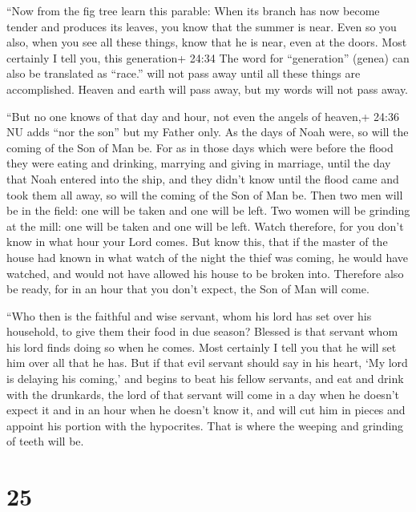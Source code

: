  ``Now from the fig tree learn this parable: When its
branch has now become tender and produces its leaves, you know that the
summer is near.  Even so you also, when you see all these
things, know that he is near, even at the doors.  Most
certainly I tell you, this generation+ 24:34 The word for ``generation''
(genea) can also be translated as ``race.'' will not pass away until all
these things are accomplished.  Heaven and earth will pass
away, but my words will not pass away.

 ``But no one knows of that day and hour, not even the
angels of heaven,+ 24:36 NU adds ``nor the son'' but my Father only.
 As the days of Noah were, so will the coming of the Son of
Man be.  For as in those days which were before the flood
they were eating and drinking, marrying and giving in marriage, until
the day that Noah entered into the ship,  and they didn't
know until the flood came and took them all away, so will the coming of
the Son of Man be.  Then two men will be in the field: one
will be taken and one will be left.  Two women will be
grinding at the mill: one will be taken and one will be left.
 Watch therefore, for you don't know in what hour your Lord
comes.  But know this, that if the master of the house had
known in what watch of the night the thief was coming, he would have
watched, and would not have allowed his house to be broken into.
 Therefore also be ready, for in an hour that you don't
expect, the Son of Man will come.

 ``Who then is the faithful and wise servant, whom his lord
has set over his household, to give them their food in due season?
 Blessed is that servant whom his lord finds doing so when
he comes.  Most certainly I tell you that he will set him
over all that he has.  But if that evil servant should say
in his heart, `My lord is delaying his coming,'  and begins
to beat his fellow servants, and eat and drink with the drunkards,
 the lord of that servant will come in a day when he
doesn't expect it and in an hour when he doesn't know it, 
and will cut him in pieces and appoint his portion with the hypocrites.
That is where the weeping and grinding of teeth will be.

\hypertarget{section-24}{%
\section{25}\label{section-24}}

